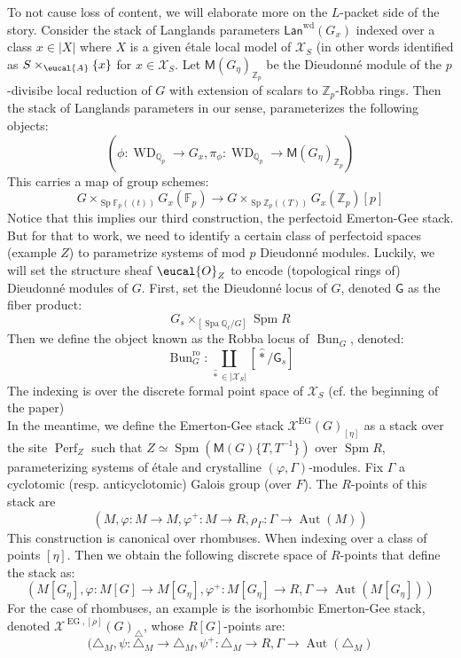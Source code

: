 \documentclass[9pt]{amsart}
\let\texcal\mathcal
\renewcommand{\[}{\begin{equation}}
\renewcommand{\]}{\end{equation}}
\newcommand{\on}{\operatorname}
\theoremstyle{plain}
\theoremstyle{remark}
\begin{document}
To not cause loss of content, we will elaborate more on the $L$-packet side of the story. Consider the stack of Langlands parameters $\mathsf{Lan}^{\on{wd}}(G_x)$ indexed over a class $x \in |X|$ where $X$ is a given étale local model of $\texcal{X}_{S}$ (in other words identified as $S \times_{\eucal{A}} \{x\}$ for $x \in \texcal{X}_S$. Let $\mathsf{M}(G_{\eta})_{\mathbb{Z}_p}$ be the Dieudonné module of the $p$-divisibe local reduction of $G$ with extension of scalars to $\mathbb{Z}_p$-Robba rings. Then the stack of Langlands parameters in our sense, parameterizes the following objects:
\[(\phi: \on{WD}_{\mathbb{Q}_p} \to G_x, \pi_{\phi}: \on{WD}_{\mathbb{Q}_p} \to \mathsf{M}(G_{\eta})_{\mathbb{Z}_p})\]
This carries a map of group schemes:
\[G \times_{\on{Sp}\mathbb{F}_p(\!(t)\!)} G_x(\mathbb{F}_p) \to G \times_{\on{Sp}\mathbb{Z}_p(\!(T)\!)} G_x(\mathbb{Z}_p)[p]\]
Notice that this implies our third construction, the perfectoid Emerton-Gee stack. But for that to work, we need to identify a certain class of perfectoid spaces (example $Z$) to parametrize systems of mod $p$ Dieudonné modules. Luckily, we will set the structure sheaf $\eucal{O}_Z$
to encode (topological rings of) Dieudonné modules of $G$. First, set the Dieudonné locus of $G$, denoted $\mathsf{G}$ as the fiber product:
\[G_s \times_{[\on{Spa} \mathbb{Q_{\ell}}/G]} \on{Spm} R\]
Then we define the object known as the Robba locus of $\on{Bun}_G$, denoted: 
\[\on{Bun}^{\text{ro}}_G: \coprod_{\widehat{*} \in |\texcal{X}_S|} [\widehat{*}/\mathsf{G}_s]\]
The indexing is over the discrete formal point space of $\texcal{X}_S$ (cf. the beginning of the paper)\\
In the meantime, we define the Emerton-Gee stack $\texcal{X}^{\on{EG}}(G)_{[\eta]}$ as a stack over the site $\on{Perf}_Z$ such that $Z \simeq \on{Spm}(\mathsf{M}(G)\{T, T^{-1}\})$ over $\on{Spm} R$, parameterizing systems of étale and crystalline $(\varphi, \Gamma)$-modules. Fix $\Gamma$ a cyclotomic (resp. anticyclotomic) Galois group (over $F$). The $R$-points of this stack are
\[(M, \varphi: M \to M, \varphi^+: M \to R, \rho_{\Gamma}: \Gamma \to \on{Aut}(M))\]  This construction is canonical over rhombuses. When indexing over a class of points $[\eta]$. Then we obtain the following discrete space of $R$-points that define the stack as:
\[(M[G_{\eta}], \varphi: M[G] \to M[G_{\eta}], \varphi^+: M[G_{\eta}] \to R, \Gamma \to \on{Aut}(M[G_{\eta}]))\]
For the case of rhombuses, an example is the isorhombic Emerton-Gee stack, denoted $\texcal{X}^{\on{EG}, [\rho]}(G)_{\triangle}$, whose $R[G]$-points are:
\[(\triangle_M, \psi: \triangle_M\to \triangle_M, \psi^+: \triangle_M \to R, \Gamma \to \on{Aut}(\triangle_M)\] 
\end{document}
